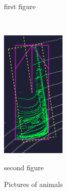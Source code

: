 \documentclass[letterpaper, 10 pt, conference]{ieeeconf}  %
\begin{document}
\begin{figure}
\begin{minipage}{0.22\textwidth}
		\caption{first figure}
	\end{minipage}\hfill
    ~
	\begin{minipage}{0.22\textwidth}
		\centering
		\includegraphics[width=\textwidth]{./figures/adjust-naively} %
		\caption{second figure}
	\end{minipage}\hfill
	\caption{Pictures of animals}\label{fig:animals}
\end{figure}
\end{document}
